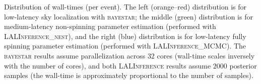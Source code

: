 \label{fig:wall-time} Distribution of wall-times (per event). The left (orange--red) distribution is for low-latency sky localization with \textsc{bayestar}; the middle (green) distribution is for medium-latency non-spinning parameter estimation (performed with \textsc{LALInference\_nest}), and the right (blue) distribution is for low-latency fully spinning parameter estimation (performed with \textsc{LALInference\_MCMC}). The \textsc{bayestar} results assume parallelization across $32$ cores (wall-time scales inversely with the number of cores), and both \textsc{LALInference} results assume $2000$ posterior samples (the wall-time is approximately proportional to the number of samples).
  